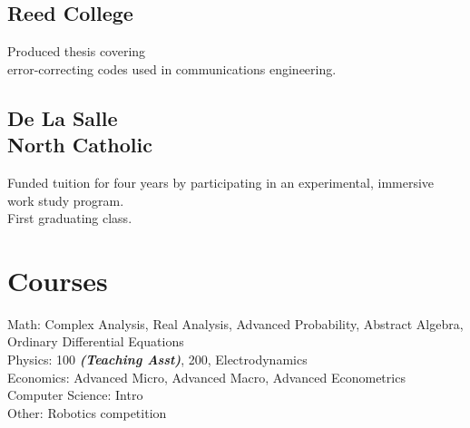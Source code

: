 \documentclass[]{deemweaver}
\begin{document}
\begin{minipage}[t]{0.33\textwidth}
\subsection{Reed College}
Produced thesis covering \\ error-correcting codes used in communications engineering.
\sectionsep

\subsection{De La Salle \protect\\ North Catholic}
Funded tuition for four years by participating in an experimental,
immersive work study program. \\First graduating class.
\sectionsep

\section{Courses}

Math: Complex Analysis, Real Analysis, Advanced Probability, Abstract Algebra, Ordinary Differential Equations \\
Physics: 100 {\footnotesize \textit{\textbf{(Teaching Asst)}}}, 200, Electrodynamics \\
Economics: Advanced Micro, Advanced Macro, Advanced Econometrics\\
Computer Science: Intro \\
Other: Robotics competition
%
%

\end{minipage}
\hfill
\end{document}
